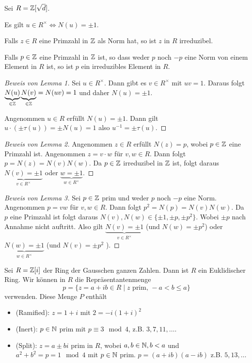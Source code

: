 Sei $R = \mathbb{Z}[\sqrt{d}]$.
\begin{lemma}
	Es gilt $u \in R^{\times} \Leftrightarrow N(u) = \pm 1$.
\end{lemma}

\begin{lemma}
	Falls $z \in R$ eine Primzahl in $\mathbb{Z}$ als Norm hat, so ist $z$ in $R$ irreduzibel.
\end{lemma}

\begin{lemma}
	Falls $p \in \mathbb{Z}$ eine Primzahl in $\mathbb{Z}$ ist, so dass weder  $p$ noch $-p$ eine Norm von einem Element
	in $R$ ist, so ist $p$ ein irreduzibles Element in $R$.
\end{lemma}

\begin{proof}[Beweis von Lemma 1]
	Sei $u \in R^{\times}$. Dann gibt es $v \in R^{\times}$ mit $uv = 1$. Daraus folgt $\underbrace{N(u)}_{\in \mathbb{Z}} \underbrace{N(v)}_{\in \mathbb{Z}} = N(uv) = 1$ 
	und daher $N(u) = \pm 1$.

	Angenommen  $u \in R$ erfüllt $N(u) = \pm 1$. Dann gilt $u \cdot (\pm \tau(u)) = \pm N(u) = 1$ also $u^{-1} = \pm \tau(u)$.
\end{proof}

\begin{proof}[Beweis von Lemma 2]
	Angenommen $z \in R$ erfüllt $N(z) = p$, wobei $p \in \mathbb{Z}$ eine Primzahl ist.
	Angenommen $z = v\cdot w$ für $v,w \in R$. Dann folgt $p = N(z) = N(v) N(w)$.
	Da $p \in \mathbb{Z}$ irreduzibel in $\mathbb{Z}$ ist, folgt daraus $\underbrace{N(v) = \pm 1}_{v \in R^{\times}}$ oder $\underbrace{w = \pm 1}_{w \in R^{\times}}$.
\end{proof}

\begin{proof}[Beweis von Lemma 3]
	Sei $p \in \mathbb{Z}$ prim und weder $p $ noch $-p$ eine Norm.
	Angenommen $p = vw$ für $v,w \in R$. Dann folgt $p^2 = N(p) = N(v) N(w)$.
	Da $p$ eine Primzahl ist folgt daraus $N(v), N(w) \in \{\pm 1, \pm p, \pm p^2\}$.
	Wobei $\pm p$ nach Annahme nicht auftritt. 
	Also gilt $\underbrace{N(v) = \pm 1}_{v \in R^{\times}}$ (und  $N(w) = \pm p^2$) oder $\underbrace{N(w) = \pm 1}_{w \in R^{\times}}$ (und $N(v) = \pm p^2$ ).
\end{proof}

\begin{theorem}
	Sei $R = \mathbb{Z}[i]$ der Ring der Gausschen ganzen Zahlen.
	Dann ist $R$ ein Euklidischer Ring. Wir können in $R$ die Repräsentantenmenge
	\[
	p = \{z = a + ib \in R \mid z \text{ prim, } -a < b \leq a\} 
	\] 
	verwenden. Diese Menge $P$ enthält
	\begin{itemize}
		\item (Ramified): $z = 1+i$ mit $2 = -i (1+i)^2$
		\item (Inert): $p \in \mathbb{N}$ prim mit $p \equiv 3 \mod 4$,
			z.B. $3,7,11,\ldots$.
		\item (Split): $z = a \pm b i$ prim in $R$, wobei $a,b \in \mathbb{N}, b < a$ und
			$a^2 + b^2 = p = 1 \mod 4$ mit $p \in \mathbb{N}$ prim. $p = (a+ib)(a-ib)$ 
			z.B. $5,13,\ldots$
	\end{itemize}
\end{theorem}

